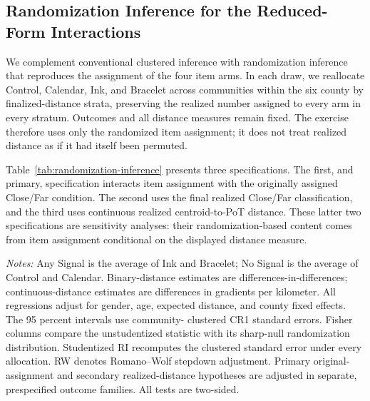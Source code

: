 \documentclass[12pt]{article}
\begin{document}
\providecommand{\StructuralRobustnessPath}{appendix/structural-robustness}

\clearpage
\subsection{Randomization Inference for the Reduced-Form Interactions}
\label{app:randomization-inference}

We complement conventional clustered inference with randomization inference that
reproduces the assignment of the four item arms. In each draw, we reallocate
Control, Calendar, Ink, and Bracelet across communities within the six county by
finalized-distance strata, preserving the realized number assigned to every arm
in every stratum. Outcomes and all distance measures remain fixed. The exercise
therefore uses only the randomized item assignment; it does not treat realized
distance as if it had itself been permuted.

Table~\ref{tab:randomization-inference} presents three specifications. The first,
and primary, specification interacts item assignment with the originally assigned
Close/Far condition. The second uses the final realized Close/Far classification,
and the third uses continuous realized centroid-to-PoT distance. These latter two
specifications are sensitivity analyses: their randomization-based content comes
from item assignment conditional on the displayed distance measure.

\begin{table}[htbp]
  \centering
  \scriptsize
  \caption{Randomization inference for treatment-by-distance effects}
  \label{tab:randomization-inference}
  \resizebox{\linewidth}{!}{%
    }
  \begin{minipage}{0.96\linewidth}
    \vspace{0.3em}\footnotesize
    \textit{Notes:} Any Signal is the average of Ink and Bracelet; No Signal is
    the average of Control and Calendar. Binary-distance estimates are
    differences-in-differences; continuous-distance estimates are differences
    in gradients per kilometer. All regressions adjust for gender, age, expected
    distance, and county fixed effects. The 95 percent intervals use community-
    clustered CR1 standard errors. Fisher columns compare the unstudentized
    statistic with its sharp-null randomization distribution. Studentized RI
    recomputes the clustered standard error under every allocation. RW denotes
    Romano--Wolf stepdown adjustment. Primary original-assignment and secondary
    realized-distance hypotheses are adjusted in separate, prespecified outcome
    families. All tests are two-sided.
  \end{minipage}
\end{table}
\end{document}
